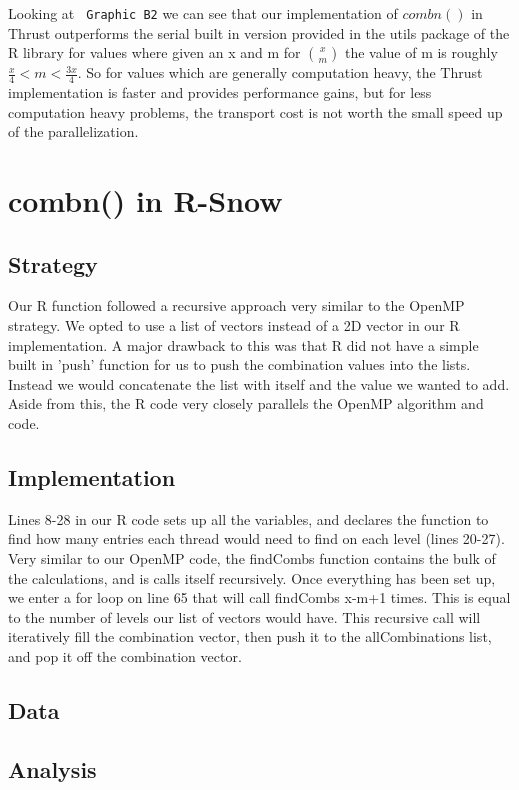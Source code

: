 \documentclass[titlepage, 11pt]{article}
\begin{document}
Looking at \verb; Graphic B2; we can see that our implementation of $combn()$ in Thrust outperforms the serial built in version provided in the utils package of the R library for values where given an x and m for ${x \choose m}$ the value of m is roughly $\frac{x}{4} < m < \frac{3x}{4}$. So for values which are generally computation heavy, the Thrust implementation is faster and provides performance gains, but for less computation heavy problems, the transport cost is not worth the small speed up of the parallelization.

\section{combn() in R-Snow}

\subsection{Strategy}
Our R function followed a recursive approach very similar to the OpenMP strategy. We opted to use a list of vectors instead of a 2D vector in our R implementation. A major drawback to this was that R did not have a simple built in 'push' function for us to push the combination values into the lists. Instead we would concatenate the list with itself and the value we wanted to add. Aside from this, the R code very closely parallels the OpenMP algorithm and code.

\subsection{Implementation}
Lines 8-28 in our R code sets up all the variables, and declares the function to find how many entries each thread would need to find on each level (lines 20-27). Very similar to our OpenMP code, the findCombs function contains the bulk of the calculations, and is calls itself recursively. Once everything has been set up, we enter a for loop on line 65 that will call findCombs x-m+1 times. This is equal to the number of levels our list of vectors would have. This recursive call will iteratively fill the combination vector, then push it to the allCombinations list, and pop it off the combination vector.

\subsection{Data}


\subsection{Analysis}
\end{document}
